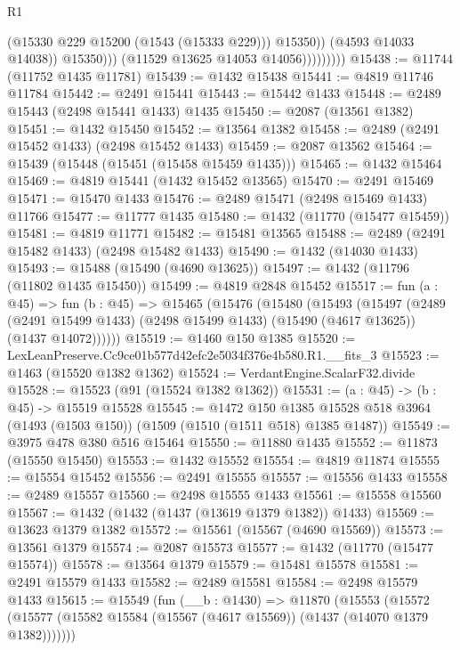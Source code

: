 \begin{lexlean}{R1}
\begin{coremodule}
                                (@15330 @229 @15200 (@1543 (@15333 @229)))
                                @15350))
                            (@4593 @14033 @14038))
                          @15350)))
                    (@11529 @13625 @14053 @14056)))))))))
@15438 := @11744 (@11752 @1435 @11781)
@15439 := @1432 @15438
@15441 := @4819 @11746 @11784
@15442 := @2491 @15441
@15443 := @15442 @1433
@15448 := @2489 @15443 (@2498 @15441 @1433) @1435
@15450 := @2087 (@13561 @1382)
@15451 := @1432 @15450
@15452 := @13564 @1382
@15458 := @2489 (@2491 @15452 @1433) (@2498 @15452 @1433)
@15459 := @2087 @13562
@15464 := @15439 (@15448 (@15451 (@15458 @15459 @1435)))
@15465 := @1432 @15464
@15469 := @4819 @15441 (@1432 @15452 @13565)
@15470 := @2491 @15469
@15471 := @15470 @1433
@15476 := @2489 @15471 (@2498 @15469 @1433) @11766
@15477 := @11777 @1435
@15480 := @1432 (@11770 (@15477 @15459))
@15481 := @4819 @11771
@15482 := @15481 @13565
@15488 := @2489 (@2491 @15482 @1433) (@2498 @15482 @1433)
@15490 := @1432 (@14030 @1433)
@15493 := @15488 (@15490 (@4690 @13625))
@15497 := @1432 (@11796 (@11802 @1435 @15450))
@15499 := @4819 @2848 @15452
@15517 := fun (a : @45) =>
  fun (b : @45) =>
  @15465
    (@15476
      (@15480
        (@15493
          (@15497
            (@2489
              (@2491 @15499 @1433)
              (@2498 @15499 @1433)
              (@15490 (@4617 @13625))
              (@1437 @14072))))))
@15519 := @1460 @150 @1385
@15520 := LexLeanPreserve.Cc9ce01b577d42efc2e5034f376e4b580.R1.__fits_3
@15523 := @1463 (@15520 @1382 @1362)
@15524 := VerdantEngine.ScalarF32.divide
@15528 := @15523 (@91 (@15524 @1382 @1362))
@15531 := (a : @45) -> (b : @45) -> @15519 @15528
@15545 := @1472
    @150
    @1385
    @15528
    @518
    @3964
    (@1493 (@1503 @150))
    (@1509 (@1510 (@1511 @518) @1385 @1487))
@15549 := @3975 @478 @380 @516 @15464
@15550 := @11880 @1435
@15552 := @11873 (@15550 @15450)
@15553 := @1432 @15552
@15554 := @4819 @11874
@15555 := @15554 @15452
@15556 := @2491 @15555
@15557 := @15556 @1433
@15558 := @2489 @15557
@15560 := @2498 @15555 @1433
@15561 := @15558 @15560
@15567 := @1432 (@1432 (@1437 (@13619 @1379 @1382)) @1433)
@15569 := @13623 @1379 @1382
@15572 := @15561 (@15567 (@4690 @15569))
@15573 := @13561 @1379
@15574 := @2087 @15573
@15577 := @1432 (@11770 (@15477 @15574))
@15578 := @13564 @1379
@15579 := @15481 @15578
@15581 := @2491 @15579 @1433
@15582 := @2489 @15581
@15584 := @2498 @15579 @1433
@15615 := @15549
    (fun (__b : @1430) =>
    @11870
      (@15553
        (@15572 (@15577 (@15582 @15584 (@15567 (@4617 @15569)) (@1437 (@14070 @1379 @1382)))))))

\end{coremodule}
\end{lexlean}
